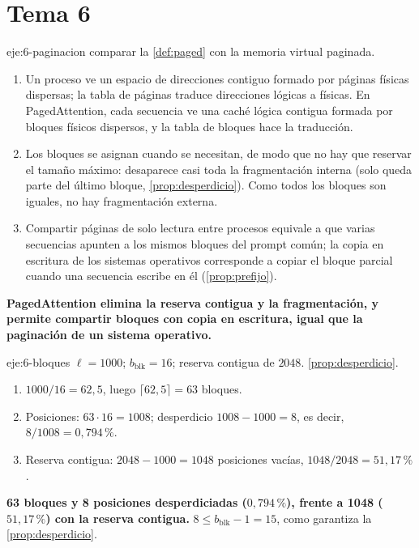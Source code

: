 \section{Tema 6}

\begin{solucion}{eje:6-paginacion}
\planteamiento comparar la \cref{def:paged} con la memoria virtual paginada.
\pasos
\begin{enumerate}[label=\arabic*.]
  \item Un proceso ve un espacio de direcciones contiguo formado por páginas físicas dispersas; la tabla de páginas traduce direcciones lógicas a físicas. En PagedAttention, cada secuencia ve una caché lógica contigua formada por bloques físicos dispersos, y la tabla de bloques hace la traducción.
  \item Los bloques se asignan cuando se necesitan, de modo que no hay que reservar el tamaño máximo: desaparece casi toda la fragmentación interna (solo queda parte del último bloque, \cref{prop:desperdicio}). Como todos los bloques son iguales, no hay fragmentación externa.
  \item Compartir páginas de solo lectura entre procesos equivale a que varias secuencias apunten a los mismos bloques del prompt común; la copia en escritura de los sistemas operativos corresponde a copiar el bloque parcial cuando una secuencia escribe en él (\cref{prop:prefijo}).
\end{enumerate}
\resultado \textbf{PagedAttention elimina la reserva contigua y la fragmentación, y permite compartir bloques con copia en escritura, igual que la paginación de un sistema operativo.}
\end{solucion}

\begin{solucion}{eje:6-bloques}
\datos $\ell=1000$; $b_{\mathrm{blk}}=16$; reserva contigua de $2048$.
\planteamiento \cref{prop:desperdicio}.
\pasos
\begin{enumerate}[label=\arabic*.]
  \item $1000/16=62{,}5$, luego $\lceil 62{,}5\rceil=63$ bloques.
  \item Posiciones: $63\cdot 16=1008$; desperdicio $1008-1000=8$, es decir, $8/1008=0{,}794\,\%$.
  \item Reserva contigua: $2048-1000=1048$ posiciones vacías, $1048/2048=51{,}17\,\%$.
\end{enumerate}
\resultado \textbf{63 bloques y 8 posiciones desperdiciadas ($0{,}794\,\%$), frente a 1048 ($51{,}17\,\%$) con la reserva contigua.}
\comprobacion $8\le b_{\mathrm{blk}}-1=15$, como garantiza la \cref{prop:desperdicio}.
\end{solucion}

